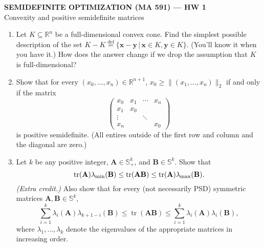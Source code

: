 \documentclass[onesided,10pt]{article}
\newcommand{\real}{\mathbb{R}}
\newcommand{\bS}{\mathbb{S}}
\newcommand{\defeq}{\ensuremath{\overset{\mathrm{def}}{=}}}
\DeclareMathOperator*{\tr}{tr}
\newcommand{\vA}{\mathbf{A}}
\newcommand{\vB}{\mathbf{B}}
\newcommand{\vx}{\mathbf{x}}
\newcommand{\vy}{\mathbf{y}}
\newcommand{\lambdamin}{\lambda_\textup{min}}
\newcommand{\lambdamax}{\lambda_\textup{max}}
\begin{document}
\begin{center}
	\textbf{SEMIDEFINITE OPTIMIZATION (MA 591) --- HW 1}\\[0.5em]
	Convexity and positive semidefinite matrices
\end{center}
\medskip

\begin{enumerate}[\bfseries 1.]
\item Let $K\subseteq \real^n$ be a full-dimensional convex cone. Find the simplest possible description of the set $K-K \defeq \{\vx-\vy\,|\, \vx\in K, \vy\in K\}.$ (You'll know it when you have it.) How does the answer change if we drop the assumption that $K$ is full-dimensional?

\item Show that for every $(x_0,\dots,x_n)\in\real^{n+1}$, $x_0 \geq \|(x_1,\dots,x_n)\|_2$ if and only if the matrix
\[\left(\begin{matrix}
x_0 & x_1 & \cdots & x_n \\
x_1 & x_0                \\                 
\vdots &  & \ddots \\
x_n    &  &        & x_0
\end{matrix}\right)\]
is positive semidefinite. (All entires outside of the first row and column and the diagonal are zero.)

\item Let $k$ be any positive integer, $\vA\in\bS^k_+$, and $\vB\in\bS^k$. Show that
\[ \tr(\vA)\lambdamin(\vB) \leq \tr(\vA\vB) \leq \tr(\vA)\lambdamax(\vB). \]
\textit{(Extra credit.)} Also show that for every (not necessarily PSD) symmetric matrices $\vA,\vB\in\bS^k$,
	\[ \sum_{i=1}^k \lambda_i(\vA)\lambda_{k+1-i}(\vB) \leq \tr(\vA\vB) \leq \sum_{i=1}^k \lambda_i(\vA)\lambda_{i}(\vB), \]
where $\lambda_1,\dots,\lambda_k$ denote the eigenvalues of the appropriate matrices in increasing order.
	

\end{enumerate}
\end{document}
